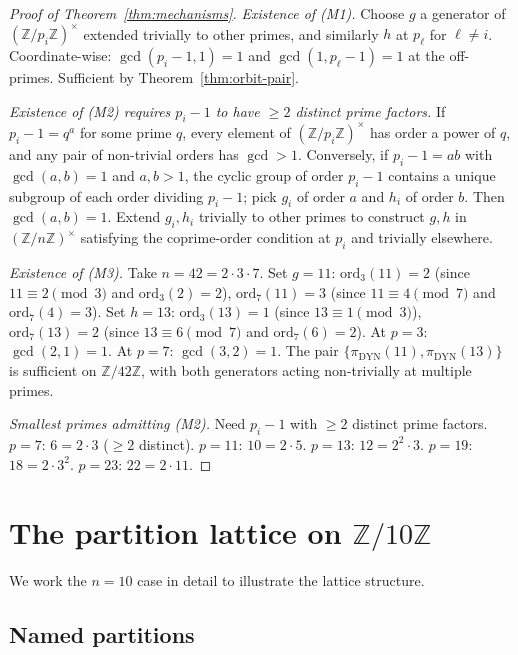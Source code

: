 \documentclass[11pt,reqno]{amsart}
\theoremstyle{plain}
\theoremstyle{definition}
\newcommand{\Z}{\mathbb{Z}}
\newcommand{\Zns}{(\Z/n\Z)^{\times}}
\newcommand{\DYN}{\mathrm{DYN}}
\newcommand{\ord}{\mathrm{ord}}
\begin{document}
\begin{proof}[Proof of Theorem~\ref{thm:mechanisms}]
\emph{Existence of (M1).} Choose $g$ a generator of $(\Z/p_i\Z)^{\times}$ extended trivially to other primes, and similarly $h$ at $p_{\ell}$ for $\ell \neq i$. Coordinate-wise: $\gcd(p_i - 1, 1) = 1$ and $\gcd(1, p_{\ell} - 1) = 1$ at the off-primes. Sufficient by Theorem~\ref{thm:orbit-pair}.

\emph{Existence of (M2) requires $p_i - 1$ to have $\geq 2$ distinct prime factors.} If $p_i - 1 = q^a$ for some prime $q$, every element of $(\Z/p_i\Z)^{\times}$ has order a power of $q$, and any pair of non-trivial orders has $\gcd > 1$. Conversely, if $p_i - 1 = a b$ with $\gcd(a,b) = 1$ and $a,b > 1$, the cyclic group of order $p_i - 1$ contains a unique subgroup of each order dividing $p_i - 1$; pick $g_i$ of order $a$ and $h_i$ of order $b$. Then $\gcd(a,b) = 1$. Extend $g_i, h_i$ trivially to other primes to construct $g, h$ in $\Zns$ satisfying the coprime-order condition at $p_i$ and trivially elsewhere.

\emph{Existence of (M3).} Take $n = 42 = 2 \cdot 3 \cdot 7$. Set $g = 11$: $\ord_3(11) = 2$ (since $11 \equiv 2 \pmod 3$ and $\ord_3(2) = 2$), $\ord_7(11) = 3$ (since $11 \equiv 4 \pmod 7$ and $\ord_7(4) = 3$). Set $h = 13$: $\ord_3(13) = 1$ (since $13 \equiv 1 \pmod 3$), $\ord_7(13) = 2$ (since $13 \equiv 6 \pmod 7$ and $\ord_7(6) = 2$). At $p = 3$: $\gcd(2,1) = 1$. At $p = 7$: $\gcd(3,2) = 1$. The pair $\{\pi_{\DYN}(11), \pi_{\DYN}(13)\}$ is sufficient on $\Z/42\Z$, with both generators acting non-trivially at multiple primes.

\emph{Smallest primes admitting (M2).} Need $p_i - 1$ with $\geq 2$ distinct prime factors. $p = 7$: $6 = 2 \cdot 3$ ($\geq 2$ distinct). $p = 11$: $10 = 2 \cdot 5$. $p = 13$: $12 = 2^2 \cdot 3$. $p = 19$: $18 = 2 \cdot 3^2$. $p = 23$: $22 = 2 \cdot 11$.
\end{proof}

\section{The partition lattice on $\Z/10\Z$} \label{sec:n10}

We work the $n = 10$ case in detail to illustrate the lattice structure.

\subsection{Named partitions}
\end{document}
